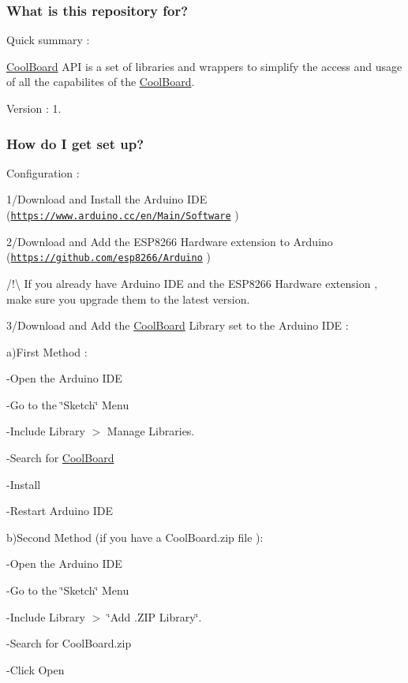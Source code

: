 \subsubsection*{What is this repository for?}

Quick summary \+:

\hyperlink{class_cool_board}{Cool\+Board} A\+PI is a set of libraries and wrappers to simplify the access and usage of all the capabilites of the \hyperlink{class_cool_board}{Cool\+Board}.

Version \+: 1.

\subsubsection*{How do I get set up?}

Configuration \+:

1/\+Download and Install the Arduino I\+DE (\href{https://www.arduino.cc/en/Main/Software}{\tt https\+://www.\+arduino.\+cc/en/\+Main/\+Software} )

2/\+Download and Add the E\+S\+P8266 Hardware extension to Arduino (\href{https://github.com/esp8266/Arduino}{\tt https\+://github.\+com/esp8266/\+Arduino} )

/!\textbackslash{} If you already have Arduino I\+DE and the E\+S\+P8266 Hardware extension , make sure you upgrade them to the latest version.

3/\+Download and Add the \hyperlink{class_cool_board}{Cool\+Board} Library set to the Arduino I\+DE \+:

a)First Method \+:

-\/\+Open the Arduino I\+DE

-\/\+Go to the \char`\"{}\+Sketch\char`\"{} Menu

-\/\+Include Library $>$ Manage Libraries.

-\/\+Search for \hyperlink{class_cool_board}{Cool\+Board}

-\/\+Install

-\/\+Restart Arduino I\+DE

b)Second Method (if you have a Cool\+Board.\+zip file )\+:

-\/\+Open the Arduino I\+DE

-\/\+Go to the \char`\"{}\+Sketch\char`\"{} Menu

-\/\+Include Library $>$ \char`\"{}\+Add .\+Z\+I\+P Library\char`\"{}.

-\/\+Search for Cool\+Board.\+zip

-\/\+Click Open

